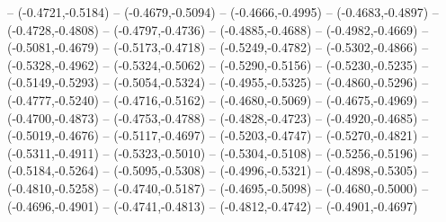{	-- (-0.4721,-0.5184)
	-- (-0.4679,-0.5094)
	-- (-0.4666,-0.4995)
	-- (-0.4683,-0.4897)
	-- (-0.4728,-0.4808)
	-- (-0.4797,-0.4736)
	-- (-0.4885,-0.4688)
	-- (-0.4982,-0.4669)
	-- (-0.5081,-0.4679)
	-- (-0.5173,-0.4718)
	-- (-0.5249,-0.4782)
	-- (-0.5302,-0.4866)
	-- (-0.5328,-0.4962)
	-- (-0.5324,-0.5062)
	-- (-0.5290,-0.5156)
	-- (-0.5230,-0.5235)
	-- (-0.5149,-0.5293)
	-- (-0.5054,-0.5324)
	-- (-0.4955,-0.5325)
	-- (-0.4860,-0.5296)
	-- (-0.4777,-0.5240)
	-- (-0.4716,-0.5162)
	-- (-0.4680,-0.5069)
	-- (-0.4675,-0.4969)
	-- (-0.4700,-0.4873)
	-- (-0.4753,-0.4788)
	-- (-0.4828,-0.4723)
	-- (-0.4920,-0.4685)
	-- (-0.5019,-0.4676)
	-- (-0.5117,-0.4697)
	-- (-0.5203,-0.4747)
	-- (-0.5270,-0.4821)
	-- (-0.5311,-0.4911)
	-- (-0.5323,-0.5010)
	-- (-0.5304,-0.5108)
	-- (-0.5256,-0.5196)
	-- (-0.5184,-0.5264)
	-- (-0.5095,-0.5308)
	-- (-0.4996,-0.5321)
	-- (-0.4898,-0.5305)
	-- (-0.4810,-0.5258)
	-- (-0.4740,-0.5187)
	-- (-0.4695,-0.5098)
	-- (-0.4680,-0.5000)
	-- (-0.4696,-0.4901)
	-- (-0.4741,-0.4813)
	-- (-0.4812,-0.4742)
	-- (-0.4901,-0.4697)
}

